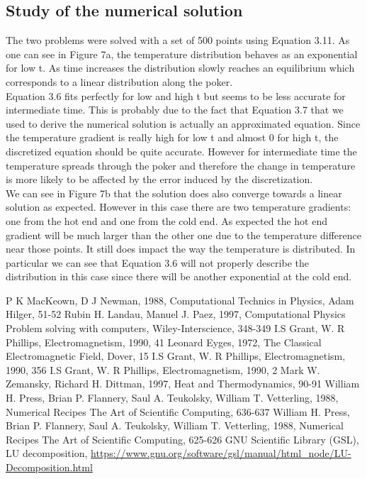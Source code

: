 \documentclass[10 pt]{article}
\numberwithin{equation}{section}
\begin{document}
\begin{multicols}{2}

\subsection{Study of the numerical solution}

The two problems were solved with a set of 500 points using Equation 3.11. As one can see in Figure 7a, the temperature distribution behaves as an exponential for low t. As time increases the distribution slowly reaches an equilibrium which corresponds to a linear distribution along the poker.\\
Equation 3.6 fits perfectly for low and high t but seems to be less accurate for intermediate time. This is probably due to the fact that Equation 3.7 that we used to derive the numerical solution is actually an approximated equation. Since the temperature gradient is really high for low t and almost 0 for high t, the discretized equation should be quite accurate. However for intermediate time the temperature spreads through the poker and therefore the change in temperature is more likely to be affected by the error induced by the discretization.\\
We can see in Figure 7b that the solution does also converge towards a linear solution as expected. However in this case there are two temperature gradients: one from the hot end and one from the cold end. As expected the hot end gradient will be much larger than the other one due to the temperature difference near those points. It still does impact the way the temperature is distributed. In particular we can see that Equation 3.6 will not properly describe the distribution in this case since there will be another exponential at the cold end.

\end{multicols}


\newpage
\begin{thebibliography}{1}
P K MacKeown, D J Newman, 1988, Computational Technics in Physics, Adam Hilger, 51-52
Rubin H. Landau, Manuel J. Paez, 1997, Computational Physics Problem solving with computers, Wiley-Interscience, 348-349
I.S Grant, W. R Phillips, Electromagnetism, 1990, 41
Leonard Eyges, 1972, The Classical Electromagnetic Field, Dover, 15
I.S Grant, W. R Phillips, Electromagnetism, 1990, 356
I.S Grant, W. R Phillips, Electromagnetism, 1990, 2
Mark W. Zemansky, Richard H. Dittman, 1997, Heat and Thermodynamics, 90-91
William H. Press, Brian P. Flannery, Saul A. Teukolsky, William T. Vetterling, 1988, Numerical Recipes The Art of Scientific Computing, 636-637
William H. Press, Brian P. Flannery, Saul A. Teukolsky, William T. Vetterling, 1988, Numerical Recipes The Art of Scientific Computing, 625-626
GNU Scientific Library (GSL), LU decomposition, \url{https://www.gnu.org/software/gsl/manual/html_node/LU-Decomposition.html}
\end{thebibliography}
\end{document}
